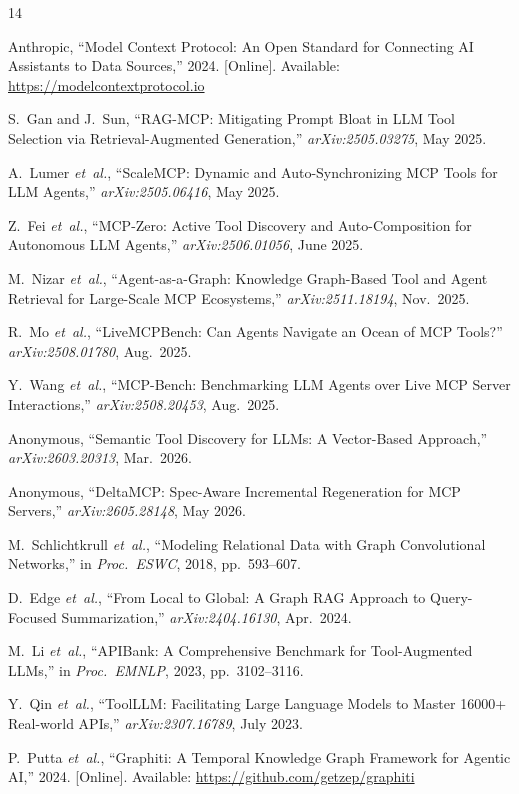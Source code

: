 \documentclass[conference]{IEEEtran}
\begin{document}
\begin{thebibliography}{14}

Anthropic, ``Model Context Protocol: An Open Standard for Connecting
AI Assistants to Data Sources,'' 2024. [Online]. Available:
\url{https://modelcontextprotocol.io}

S.~Gan and J.~Sun, ``RAG-MCP: Mitigating Prompt Bloat in LLM Tool
Selection via Retrieval-Augmented Generation,''
\emph{arXiv:2505.03275}, May 2025.

A.~Lumer \emph{et~al.}, ``ScaleMCP: Dynamic and Auto-Synchronizing
MCP Tools for LLM Agents,'' \emph{arXiv:2505.06416}, May 2025.

Z.~Fei \emph{et~al.}, ``MCP-Zero: Active Tool Discovery and
Auto-Composition for Autonomous LLM Agents,''
\emph{arXiv:2506.01056}, June 2025.

M.~Nizar \emph{et~al.}, ``Agent-as-a-Graph: Knowledge Graph-Based
Tool and Agent Retrieval for Large-Scale MCP Ecosystems,''
\emph{arXiv:2511.18194}, Nov.\ 2025.

R.~Mo \emph{et~al.}, ``LiveMCPBench: Can Agents Navigate an Ocean of
MCP Tools?'' \emph{arXiv:2508.01780}, Aug.\ 2025.

Y.~Wang \emph{et~al.}, ``MCP-Bench: Benchmarking LLM Agents over
Live MCP Server Interactions,'' \emph{arXiv:2508.20453}, Aug.\ 2025.

Anonymous, ``Semantic Tool Discovery for LLMs: A Vector-Based
Approach,'' \emph{arXiv:2603.20313}, Mar.\ 2026.

Anonymous, ``DeltaMCP: Spec-Aware Incremental Regeneration for MCP
Servers,'' \emph{arXiv:2605.28148}, May 2026.

M.~Schlichtkrull \emph{et~al.}, ``Modeling Relational Data with Graph
Convolutional Networks,'' in \emph{Proc.\ ESWC}, 2018,
pp.~593--607.

D.~Edge \emph{et~al.}, ``From Local to Global: A Graph RAG Approach
to Query-Focused Summarization,'' \emph{arXiv:2404.16130}, Apr.\
2024.

M.~Li \emph{et~al.}, ``APIBank: A Comprehensive Benchmark for
Tool-Augmented LLMs,'' in \emph{Proc.\ EMNLP}, 2023,
pp.~3102--3116.

Y.~Qin \emph{et~al.}, ``ToolLLM: Facilitating Large Language Models
to Master 16000+ Real-world APIs,'' \emph{arXiv:2307.16789}, July
2023.

P.~Putta \emph{et~al.}, ``Graphiti: A Temporal Knowledge Graph
Framework for Agentic AI,'' 2024. [Online]. Available:
\url{https://github.com/getzep/graphiti}

\end{thebibliography}
\end{document}
